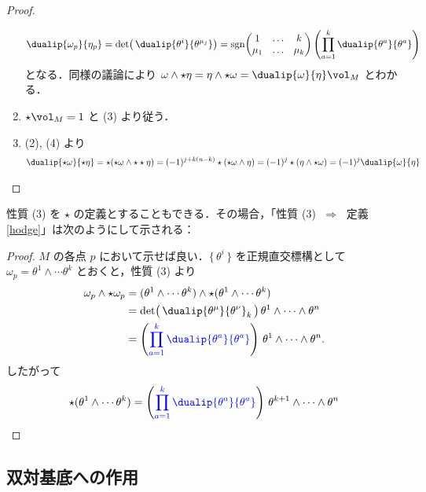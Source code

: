 \documentclass[geometry_main]{subfiles}
\begin{document}
\begin{proof}
\begin{enumerate}
		\begin{align} 
			\dualip{\omega_p}{\eta_p} = \det \bigl( \, \dualip{\theta^i}{\theta^{\mu_j}} \bigr) = \mathrm{sgn}\mqty(1 & \dots & k \\ \mu_1 & \dots & \mu_k) \left(\prod_{a=1}^k \dualip{\theta^a}{\theta^a}\right)
		\end{align}
		となる．同様の議論により $\omega \wedge \star \eta = \eta \wedge \star \omega = \dualip{\omega}{\eta} \vol_M$ とわかる．
		\item $\star\vol_M = 1$ と (3) より従う．
		\item (2), (4) より
		\begin{align} 
			\dualip{\star \omega}{\star \eta} = \star (\star \omega \wedge \star \star \eta) = (-1)^{j+k(n-k)} \star (\star \omega \wedge \eta) = (-1)^{j} \star(\eta \wedge \star \omega) = (-1)^j \dualip{\omega}{\eta}
		\end{align}
	\end{enumerate}
\end{proof}

\begin{marker} 
	性質 (3) を $\star$ の定義とすることもできる．その場合，「性質 (3) $\; \Longrightarrow\; $ 定義\ref{hodge}」は次のようにして示される：

	\begin{proof} 
		$M$ の各点 $p$ において示せば良い．$\{\, \theta^i\, \}$ を正規直交標構として $\omega_p = \theta^1 \wedge \cdots \theta^k$ とおくと，性質 (3) より
		\begin{align} 
			\omega_p \wedge \star \omega_p &= (\theta^1 \wedge \cdots \theta^k) \wedge \star (\theta^1 \wedge \cdots \theta^k) \\
			&= \det \bigl( \, \dualip{\theta^\mu}{\theta^\nu}_k \, \bigr)\, \theta^1 \wedge \cdots \wedge \theta^n \\
			&= \left(\textcolor{blue}{\prod_{a=1}^k \dualip{\theta^a}{\theta^a}} \right)\, \theta^1 \wedge \cdots \wedge \theta^n.
		\end{align}
		したがって
		\begin{align} 
			\star (\theta^1 \wedge \cdots \theta^k) = \left(\textcolor{blue}{\prod_{a=1}^k \dualip{\theta^a}{\theta^a}} \right)\, \theta^{k+1} \wedge \cdots \wedge \theta^n
		\end{align}
	\end{proof}
\end{marker}

\subsection{双対基底への作用}
\end{document}

